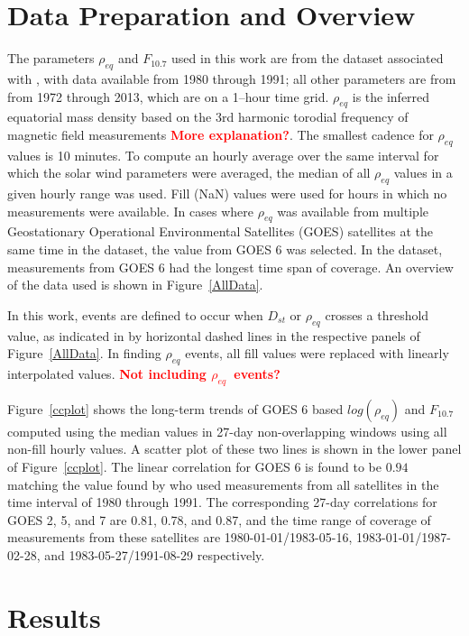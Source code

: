 \documentclass[10pt,twocolumn]{article}
\newcommand{\vinote}[1]{\textcolor{red}{\textbf{#1}}} %
\newcommand{\req}{\ensuremath{\rho_{eq}}}
\newcommand{\inote}[1]{\textcolor{blue}{\textbf{#1}}} %
\def\note#1\par{\textcolor{blue}{\textbf{#1}}\\}
\begin{document}
\section{Data Preparation and Overview}

The parameters $\rho_{eq}$ and $F_{10.7}$ used in this work are from the dataset associated with \cite{Denton}, with data available from 1980 through 1991; all other parameters are from \cite{Kondrashov2014ReconstructionOfGaps} from 1972 through 2013, which are on a 1--hour time grid. $\rho_{eq}$ is the inferred equatorial mass density based on the 3rd harmonic torodial frequency of magnetic field measurements \vinote{More explanation?}.  The smallest cadence for $\rho_{eq}$ values is 10 minutes.  To compute an hourly average over the same interval for which the solar wind parameters were averaged, the median of all $\rho_{eq}$ values in a given hourly range was used.  Fill (NaN) values were used for hours in which no measurements were available.  In cases where $\rho_{eq}$ was available from multiple Geostationary Operational Environmental Satellites (GOES) satellites at the same time in the \cite{Denton} dataset, the value from GOES 6 was selected.  In the dataset, measurements from GOES 6 had the longest time span of coverage.  An overview of the data used is shown in Figure~\ref{AllData}.

In this work, events are defined to occur when $D_{st}$ or $\rho_{eq}$ crosses a threshold value, as indicated in by horizontal dashed lines in the respective panels of Figure~\ref{AllData}.  In finding $\rho_{eq}$ events, all fill values were replaced with linearly interpolated values. \vinote{Not including \req\ events?}

Figure~\ref{ccplot} shows the long-term trends of GOES 6 based $log(\rho_{eq})$ and $F_{10.7}$ computed using the median values in 27-day non-overlapping windows using all non-fill hourly values.  A scatter plot of these two lines is shown in the lower panel of Figure~\ref{ccplot}.  The linear correlation for GOES 6 is found to be $0.94$ matching the value found by \cite{Takahashi2010} who used measurements from all satellites in the time interval of 1980 through 1991.  The corresponding 27-day correlations for GOES 2, 5, and 7 are 0.81, 0.78, and 0.87, and the time range of coverage of measurements from these satellites are 1980-01-01/1983-05-16, 1983-01-01/1987-02-28, and 1983-05-27/1991-08-29 respectively.


\section{Results}
\end{document}
